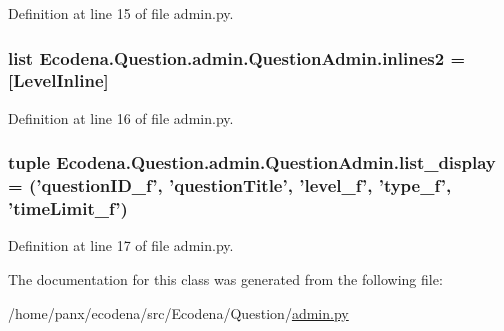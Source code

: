 Definition at line 15 of file admin.py.

\hypertarget{class_ecodena_1_1_question_1_1admin_1_1_question_admin_af415e6770a6fddb17ccec6bbeb21c957}{
\subsubsection[{inlines2}]{\setlength{\rightskip}{0pt plus 5cm}list {\bf Ecodena.Question.admin.QuestionAdmin.inlines2} = \mbox{[}{\bf LevelInline}\mbox{]}}}
\label{de/dbf/class_ecodena_1_1_question_1_1admin_1_1_question_admin_af415e6770a6fddb17ccec6bbeb21c957}


Definition at line 16 of file admin.py.

\hypertarget{class_ecodena_1_1_question_1_1admin_1_1_question_admin_a2c455e376dbf6d80c30f869216829c02}{
\subsubsection[{list\_\-display}]{\setlength{\rightskip}{0pt plus 5cm}tuple {\bf Ecodena.Question.admin.QuestionAdmin.list\_\-display} = ('questionID\_\-f', 'questionTitle', 'level\_\-f', 'type\_\-f', 'timeLimit\_\-f')}}
\label{de/dbf/class_ecodena_1_1_question_1_1admin_1_1_question_admin_a2c455e376dbf6d80c30f869216829c02}


Definition at line 17 of file admin.py.



The documentation for this class was generated from the following file:\begin{DoxyCompactItemize}
\item 
/home/panx/ecodena/src/Ecodena/Question/\hyperlink{_question_2admin_8py}{admin.py}\end{DoxyCompactItemize}
